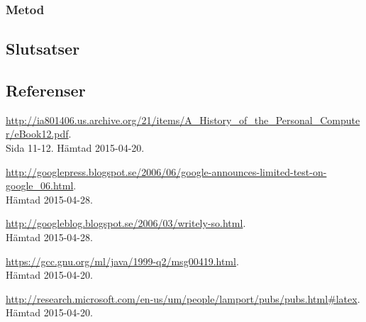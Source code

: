 \subsubsection{Metod}
\subsection{Slutsatser}
\subsection{Referenser}
\begin{thebibliography}{9}
\url{http://ia801406.us.archive.org/21/items/A\_History\_of\_the\_Personal\_Computer/eBook12.pdf}.\\
 Sida 11-12. Hämtad 2015-04-20.

\url{http://googlepress.blogspot.se/2006/06/google-announces-limited-test-on-google_06.html}.\\
 Hämtad 2015-04-28.

\url{http://googleblog.blogspot.se/2006/03/writely-so.html}.\\
 Hämtad 2015-04-28. 

\url{https://gcc.gnu.org/ml/java/1999-q2/msg00419.html}.\\
 Hämtad 2015-04-20.

\url{http://research.microsoft.com/en-us/um/people/lamport/pubs/pubs.html#latex}.\\
 Hämtad 2015-04-20.

\end{thebibliography}
